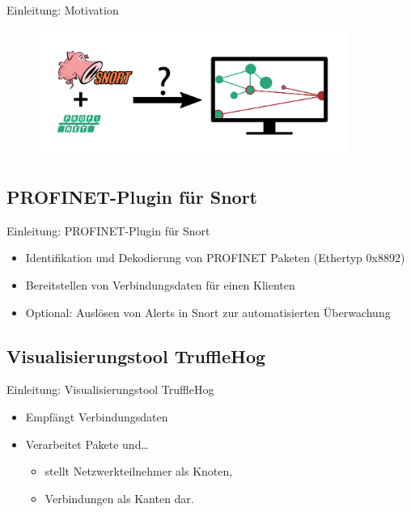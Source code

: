 \documentclass[18pt]{beamer}
\begin{document}
\begin{frame}{Einleitung: Motivation}
  	\begin{figure}
	   	\includegraphics[width=0.9\textwidth]{./images/max_4.png}
   	\end{figure}
\end{frame}

\subsection{PROFINET-Plugin für Snort}
\begin{frame}{Einleitung: PROFINET-Plugin für Snort}
	\pause
    \begin{itemize}
      \item Identifikation und Dekodierung von PROFINET Paketen (Ethertyp 0x8892)
      \pause
      \item Bereitstellen von Verbindungsdaten für einen Klienten
      \pause
      \item Optional: Auslösen von Alerts in Snort zur automatisierten Überwachung
    \end{itemize}
\end{frame}

\subsection{Visualisierungstool TruffleHog}
\begin{frame}{Einleitung: Visualisierungstool TruffleHog}
	\pause
    \begin{itemize}
      \item Empfängt Verbindungsdaten
      \pause
      \item Verarbeitet Pakete und\dots
      \pause
      \begin{itemize}
        \item stellt Netzwerkteilnehmer als Knoten, \pause
        \item Verbindungen als Kanten dar.
      \end{itemize}
    \end{itemize}
\end{frame}
\end{document}
